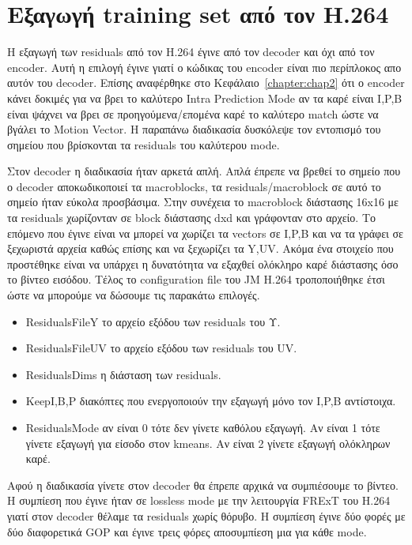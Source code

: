 \newpage

\section{Εξαγωγή training set από τον H.264}
\label{section:sect43}

\indent Η εξαγωγή των residuals από τον H.264 έγινε από τον decoder και όχι από τον encoder. Αυτή η επιλογή έγινε γιατί ο κώδικας του encoder είναι πιο περίπλοκος απο αυτόν του decoder. Επίσης αναφέρθηκε στο Κεφάλαιο~\ref{chapter:chap2} ότι ο encoder κάνει δοκιμές για να βρει το καλύτερο Intra Prediction Mode αν τα καρέ είναι I,P,B είναι ψάχνει να βρει σε προηγούμενα/επομένα καρέ το καλύτερο match ώστε να βγάλει το Motion Vector. Η παραπάνω διαδικασία δυσκόλεψε τον εντοπισμό του σημείου που βρίσκονται τα residuals του καλύτερου mode.

\indent Στον decoder η διαδικασία ήταν αρκετά απλή. Απλά έπρεπε να βρεθεί το σημείο που ο decoder αποκωδικοποιεί τα macroblocks, τα residuals/macroblock σε αυτό το σημείο ήταν εύκολα προσβάσιμα. Στην συνέχεια το macroblock διάστασης 16x16 με τα residuals χωρίζονταν σε block διάστασης dxd και γράφονταν στο αρχείο. Το επόμενο που έγινε είναι να μπορεί να χωρίζει τα vectors σε I,P,B και να τα γράφει σε ξεχωριστά αρχεία καθώς επίσης και να ξεχωρίζει τα Y,UV. Ακόμα ένα στοιχείο που προστέθηκε είναι να υπάρχει η δυνατότητα να εξαχθεί ολόκληρο καρέ διάστασης όσο το βίντεο εισόδου. Τέλος το configuration file του JM H.264 \cite{misc:jm} τροποποιήθηκε έτσι ώστε να μπορούμε να δώσουμε τις παρακάτω επιλογές.

\begin{itemize}
    \item ResidualsFileY το αρχείο εξόδου των residuals του Υ.
    \item ResidualsFileUV το αρχείο εξόδου των residuals του UV.
    \item ResidualsDims η διάσταση των residuals.
    \item KeepI,B,P διακόπτες που ενεργοποιούν την εξαγωγή μόνο τον I,P,B αντίστοιχα.
    \item ResidualsMode αν είναι 0 τότε δεν γίνετε καθόλου εξαγωγή. Αν είναι 1 τότε γίνετε εξαγωγή για είσοδο στον kmeans. Αν είναι 2 γίνετε εξαγωγή ολόκληρων καρέ.
\end{itemize}

\indent Αφού η διαδικασία γίνετε στον decoder θα έπρεπε αρχικά να συμπιέσουμε το βίντεο. Η συμπίεση που έγινε ήταν σε lossless mode με την λειτουργία FRExT του H.264 γιατί στον decoder θέλαμε τα residuals χωρίς θόρυβο. Η συμπίεση έγινε δύο φορές με δύο διαφορετικά GOP και έγινε τρεις φόρες αποσυμπίεση μια για κάθε mode.

